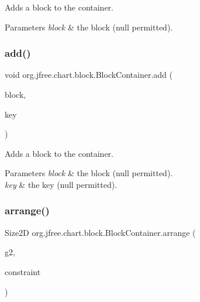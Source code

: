 Adds a block to the container.


\begin{DoxyParams}{Parameters}
{\em block} & the block ({\ttfamily null} permitted). \\
\hline
\end{DoxyParams}
\mbox{\label{classorg_1_1jfree_1_1chart_1_1block_1_1_block_container_af5c240d12e9b406df4257062e9ba749e}} 
\subsubsection{\texorpdfstring{add()}{add()}\hspace{0.1cm}{\footnotesize\ttfamily [2/2]}}
{\footnotesize\ttfamily void org.\+jfree.\+chart.\+block.\+Block\+Container.\+add (\begin{DoxyParamCaption}\item[{\mbox{\hyperlink{interfaceorg_1_1jfree_1_1chart_1_1block_1_1_block}{Block}}}]{block,  }\item[{Object}]{key }\end{DoxyParamCaption})}

Adds a block to the container.


\begin{DoxyParams}{Parameters}
{\em block} & the block ({\ttfamily null} permitted). \\
\hline
{\em key} & the key ({\ttfamily null} permitted). \\
\hline
\end{DoxyParams}
\mbox{\label{classorg_1_1jfree_1_1chart_1_1block_1_1_block_container_af4746269c5628f6ae1ce2be343e5b1e6}} 
\subsubsection{\texorpdfstring{arrange()}{arrange()}}
{\footnotesize\ttfamily Size2D org.\+jfree.\+chart.\+block.\+Block\+Container.\+arrange (\begin{DoxyParamCaption}\item[{Graphics2D}]{g2,  }\item[{\mbox{\hyperlink{classorg_1_1jfree_1_1chart_1_1block_1_1_rectangle_constraint}{Rectangle\+Constraint}}}]{constraint }\end{DoxyParamCaption})}

